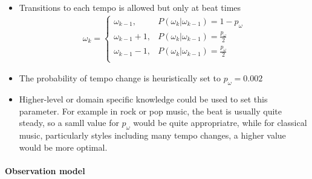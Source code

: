 \documentclass{scrartcl}
\begin{document}
\begin{itemize}
\item Transitions to each tempo is allowed but only at beat times
\begin{align}
\omega_k = 
\begin{cases}
\omega_{k-1}, & P(\omega_k|\omega_{k-1}) = 1 - p_\omega \\
\omega_{k-1}+1, & P(\omega_k|\omega_{k-1}) = \frac{p_\omega}{2} \\
\omega_{k-1}-1, & P(\omega_k|\omega_{k-1}) = \frac{p_\omega}{2} \\
\end{cases}
\end{align} 
\item The probability of tempo change is heuristically set to $p_\omega = 0.002$
\item Higher-level or domain specific knowledge could be used to set this parameter. For example in rock or pop music, the beat is usually quite steady, so a samll value for $p_\omega$ would be quite appropriatre, while for classical music, particularly styles including many tempo changes, a higher value would be more optimal.
\end{itemize}




\paragraph{Observation model}





\end{document}
